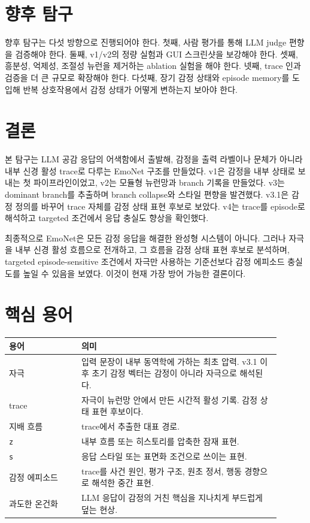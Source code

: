 \documentclass[11pt,a4paper]{article}
\newcommand{\eng}[1]{\texttt{#1}}
\begin{document}
\section{향후 탐구}

향후 탐구는 다섯 방향으로 진행되어야 한다. 첫째, 사람 평가를 통해 LLM judge 편향을 검증해야 한다. 둘째, v1/v2의 정량 실험과 GUI 스크린샷을 보강해야 한다. 셋째, 흥분성, 억제성, 조절성 뉴런을 제거하는 ablation 실험을 해야 한다. 넷째, trace 인과 검증을 더 큰 규모로 확장해야 한다. 다섯째, 장기 감정 상태와 episode memory를 도입해 반복 상호작용에서 감정 상태가 어떻게 변하는지 보아야 한다.

\section{결론}

본 탐구는 LLM 공감 응답의 어색함에서 출발해, 감정을 출력 라벨이나 문체가 아니라 내부 신경 활성 trace로 다루는 EmoNet 구조를 만들었다. v1은 감정을 내부 상태로 보내는 첫 파이프라인이었고, v2는 모듈형 뉴런망과 branch 기록을 만들었다. v3는 dominant branch를 추출하며 branch collapse와 스타일 편향을 발견했다. v3.1은 감정 정의를 바꾸어 trace 자체를 감정 상태 표현 후보로 보았다. v4는 trace를 episode로 해석하고 targeted 조건에서 응답 충실도 향상을 확인했다.

최종적으로 EmoNet은 모든 감정 응답을 해결한 완성형 시스템이 아니다. 그러나 자극을 내부 신경 활성 흐름으로 전개하고, 그 흐름을 감정 상태 표현 후보로 분석하며, targeted episode-sensitive 조건에서 자극만 사용하는 기준선보다 감정 에피소드 충실도를 높일 수 있음을 보였다. 이것이 현재 가장 방어 가능한 결론이다.

\appendix

\section{핵심 용어}

\begin{longtable}{p{0.24\linewidth}p{0.66\linewidth}}
\toprule
용어 & 의미 \\
\midrule
자극 & 입력 문장이 내부 동역학에 가하는 최초 압력. v3.1 이후 초기 감정 벡터는 감정이 아니라 자극으로 해석된다. \\
trace & 자극이 뉴런망 안에서 만든 시간적 활성 기록. 감정 상태 표현 후보이다. \\
지배 흐름 & trace에서 추출한 대표 경로. \\
\eng{z} & 내부 흐름 또는 히스토리를 압축한 잠재 표현. \\
\eng{s} & 응답 스타일 또는 표면화 조건으로 쓰이는 표현. \\
감정 에피소드 & trace를 사건 원인, 평가 구조, 원초 정서, 행동 경향으로 해석한 중간 표현. \\
과도한 온건화 & LLM 응답이 감정의 거친 핵심을 지나치게 부드럽게 덮는 현상. \\
\bottomrule
\end{longtable}
\end{document}
